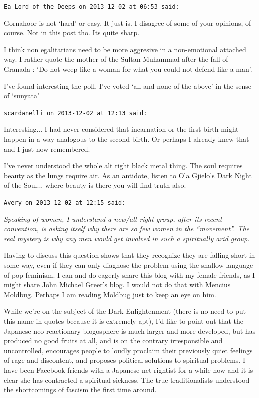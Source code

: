 \begin{footnotesize}
\begin{sffamily}
\texttt{Ea Lord of the Deeps on 2013-12-02 at 06:53 said:}

Gornahoor is not `hard' or easy. It just is. I disagree of some of your opinions, of course. Not in this post tho. Its quite sharp.

I think non egalitarians need to be more aggresive in a non-emotional attached way. I rather quote the mother of the Sultan Muhammad after the fall of Granada : `Do not weep like a woman for what you could not defend like a man'.

I've found interesting the poll. I've voted `all and none of the above' in the sense of `sunyata'

\hfill

\texttt{scardanelli on 2013-12-02 at 12:13 said:}

Interesting... I had never considered that incarnation or the first birth might happen in a way analogous to the second birth. Or perhaps I already knew that and I just now remembered.

I've never understood the whole alt right black metal thing. The soul requires beauty as the lungs require air. As an antidote, listen to Ola Gjielo's Dark Night of the Soul... where beauty is there you will find truth also.

\hfill

\texttt{Avery on 2013-12-02 at 12:15 said:}

\emph{Speaking of women, I understand a new/alt right group, after its recent convention, is asking itself why there are so few women in the ``movement''. The real mystery is why any men would get involved in such a spiritually arid group.}

Having to discuss this question shows that they recognize they are falling short in some way, even if they can only diagnose the problem using the shallow language of pop feminism. I can and do eagerly share this blog with my female friends, as I might share John Michael Greer's blog. I would not do that with Mencius Moldbug. Perhaps I am reading Moldbug just to keep an eye on him.

While we're on the subject of the Dark Enlightenment (there is no need to put this name in quotes because it is extremely apt), I'd like to point out that the Japanese neo-reactionary blogosphere is much larger and more developed, but has produced no good fruits at all, and is on the contrary irresponsible and uncontrolled, encourages people to loudly proclaim their previously quiet feelings of rage and discontent, and proposes political solutions to spiritual problems. I have been Facebook friends with a Japanese net-rightist for a while now and it is clear she has contracted a spiritual sickness. The true traditionalists understood the shortcomings of fascism the first time around.


\end{sffamily}
\end{footnotesize}
